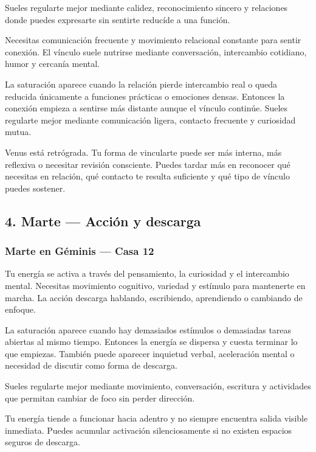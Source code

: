 \documentclass[11pt,a4paper]{article}
\begin{document}
Sueles regularte mejor mediante calidez, reconocimiento sincero y relaciones donde puedes expresarte sin sentirte reducíde a una función.

Necesitas comunicación frecuente y movimiento relacional constante para sentir conexión. El vínculo suele nutrirse mediante conversación, intercambio cotidiano, humor y cercanía mental.

La saturación aparece cuando la relación pierde intercambio real o queda reducida únicamente a funciones prácticas o emociones densas. Entonces la conexión empieza a sentirse más distante aunque el vínculo continúe. Sueles regularte mejor mediante comunicación ligera, contacto frecuente y curiosidad mutua.

Venus está retrógrada. Tu forma de vincularte puede ser más interna, más reflexiva o necesitar revisión consciente. Puedes tardar más en reconocer qué necesitas en relación, qué contacto te resulta suficiente y qué tipo de vínculo puedes sostener.

\vspace{0.8cm}

\subsection{4. Marte — Acción y descarga}

\subsubsection*{Marte en Géminis — Casa 12}

\justifying
Tu energía se activa a través del pensamiento, la curiosidad y el intercambio mental. Necesitas movimiento cognitivo, variedad y estímulo para mantenerte en marcha. La acción descarga hablando, escribiendo, aprendiendo o cambiando de enfoque.

La saturación aparece cuando hay demasiados estímulos o demasiadas tareas abiertas al mismo tiempo. Entonces la energía se dispersa y cuesta terminar lo que empiezas. También puede aparecer inquietud verbal, aceleración mental o necesidad de discutir como forma de descarga.

Sueles regularte mejor mediante movimiento, conversación, escritura y actividades que permitan cambiar de foco sin perder dirección.

Tu energía tiende a funcionar hacia adentro y no siempre encuentra salida visible inmediata. Puedes acumular activación silenciosamente si no existen espacios seguros de descarga.
\end{document}
